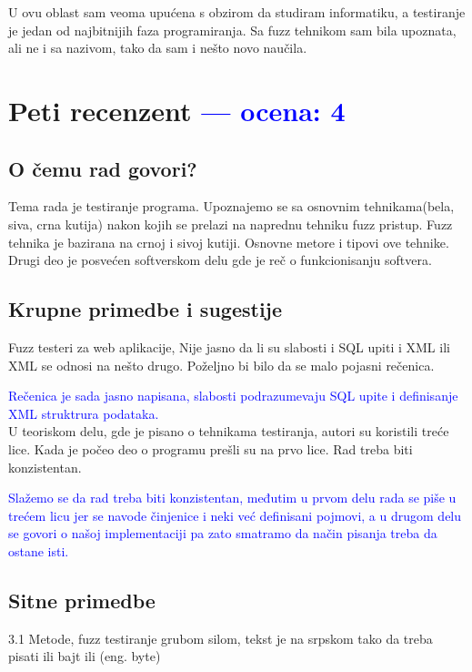 \documentclass[a4paper]{report}
\newcommand{\odgovor}[1]{\textcolor{blue}{#1}}
\begin{document}
U ovu oblast sam veoma upućena s obzirom da studiram informatiku, a testiranje je jedan od najbitnijih faza programiranja. Sa fuzz tehnikom sam bila upoznata, ali ne i sa nazivom, tako da sam i nešto novo naučila.

\chapter{Peti recenzent \odgovor{--- ocena: 4} }

\section{O čemu rad govori?}
Tema rada je testiranje programa. Upoznajemo se sa osnovnim tehnikama(bela, siva, crna kutija) nakon kojih se prelazi na naprednu tehniku fuzz pristup. Fuzz tehnika je bazirana na crnoj i sivoj kutiji. Osnovne metore i tipovi ove tehnike. Drugi deo je posvećen softverskom delu gde je reč o funkcionisanju softvera.

\section{Krupne primedbe i sugestije}
Fuzz testeri za web aplikacije, Nije jasno da li su slabosti i SQL upiti i XML ili XML se odnosi na nešto drugo. Poželjno bi bilo da se malo pojasni rečenica.

\odgovor{
Rečenica je sada jasno napisana, slabosti podrazumevaju SQL upite i definisanje XML struktrura podataka.
} \\


U teoriskom delu, gde je pisano o tehnikama testiranja, autori su koristili treće lice. Kada je počeo deo o programu prešli su na prvo lice. Rad treba biti konzistentan. 

\odgovor{
Slažemo se da rad treba biti konzistentan, međutim u prvom delu rada se piše u trećem licu jer se navode činjenice i neki već definisani pojmovi, a u drugom delu se govori o našoj implementaciji pa zato smatramo da način pisanja treba da ostane isti.
}



\section{Sitne primedbe}
3.1 Metode, fuzz testiranje grubom silom, tekst je na srpskom tako da treba pisati ili bajt ili (eng. byte)
\end{document}
